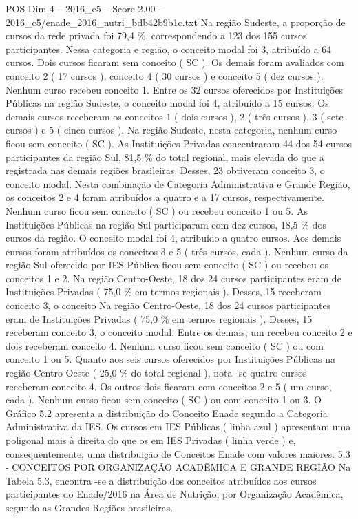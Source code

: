 \begin{textsample}{POS Dim 4 – 2016\_c5 – Score 2.00 – 2016\_c5/enade\_2016\_nutri\_bdb42b9b1c.txt}
Na região Sudeste, a proporção de cursos da rede privada foi 79,4 \%, correspondendo a 123 dos 155 cursos participantes.
Nessa categoria e região, o conceito modal foi 3, atribuído a 64 cursos.
Dois cursos ficaram sem conceito ( SC ).
Os demais foram avaliados com conceito 2 ( 17 cursos ), conceito 4 ( 30 cursos ) e conceito 5 ( dez cursos ).
Nenhum curso recebeu conceito 1.
Entre os 32 cursos oferecidos por Instituições Públicas na região Sudeste, o conceito modal foi 4, atribuído a 15 cursos.
Os demais cursos receberam os conceitos 1 ( dois cursos ), 2 ( três cursos ), 3 ( sete cursos ) e 5 ( cinco cursos ).
Na região Sudeste, nesta categoria, nenhum curso ficou sem conceito ( SC ).
As Instituições Privadas concentraram 44 dos 54 cursos participantes da região Sul, 81,5 \% do total regional, mais elevada do que a registrada nas demais regiões brasileiras.
Desses, 23 obtiveram conceito 3, o conceito modal.
Nesta combinação de Categoria Administrativa e Grande Região, os conceitos 2 e 4 foram atribuídos a quatro e a 17 cursos, respectivamente.
Nenhum curso ficou sem conceito ( SC ) ou recebeu conceito 1 ou 5.
As Instituições Públicas na região Sul participaram com dez cursos, 18,5 \% dos cursos da região.
O conceito modal foi 4, atribuído a quatro cursos.
Aos demais cursos foram atribuídos os conceitos 3 e 5 ( três cursos, cada ).
Nenhum curso da região Sul oferecido por IES Pública ficou sem conceito ( SC ) ou recebeu os conceitos 1 e 2.
Na região Centro-Oeste, 18 dos 24 cursos participantes eram de Instituições Privadas ( 75,0 \% em termos regionais ).
Desses, 15 receberam conceito 3, o conceito Na região Centro-Oeste, 18 dos 24 cursos participantes eram de Instituições Privadas ( 75,0 \% em termos regionais ).
Desses, 15 receberam conceito 3, o conceito modal.
Entre os demais, um recebeu conceito 2 e dois receberam conceito 4.
Nenhum curso ficou sem conceito ( SC ) ou com conceito 1 ou 5.
Quanto aos seis cursos oferecidos por Instituições Públicas na região Centro-Oeste ( 25,0 \% do total regional ), nota -se quatro cursos receberam conceito 4.
Os outros dois ficaram com conceitos 2 e 5 ( um curso, cada ).
Nenhum curso ficou sem conceito ( SC ) ou com conceito 1 ou 3.
O Gráfico 5.2 apresenta a distribuição do Conceito Enade segundo a Categoria Administrativa da IES.
Os cursos em IES Públicas ( linha azul ) apresentam uma poligonal mais à direita do que os em IES Privadas ( linha verde ) e, consequentemente, uma distribuição de Conceitos Enade com valores maiores. 5.3 - CONCEITOS POR ORGANIZAÇÃO ACADÊMICA E GRANDE REGIÃO Na Tabela 5.3, encontra -se a distribuição dos conceitos atribuídos aos cursos participantes do Enade/2016 na Área de Nutrição, por Organização Acadêmica, segundo as Grandes Regiões brasileiras.

\end{textsample}
